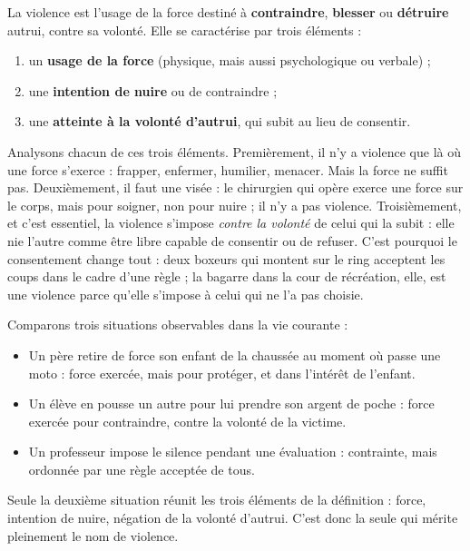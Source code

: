 \documentclass[11pt]{article}
\newcommand{\cle}[1]{{\popxbold\color{popdark}#1}}
\begin{document}
\begin{definition}[La violence]
La \cle{violence} est l'usage de la force destiné à \textbf{contraindre}, \textbf{blesser} ou \textbf{détruire} autrui, contre sa volonté. Elle se caractérise par trois éléments :
\begin{enumerate}
\item un \textbf{usage de la force} (physique, mais aussi psychologique ou verbale) ;
\item une \textbf{intention de nuire} ou de contraindre ;
\item une \textbf{atteinte à la volonté d'autrui}, qui subit au lieu de consentir.
\end{enumerate}
\end{definition}

Analysons chacun de ces trois éléments. Premièrement, il n'y a violence que là où une force s'exerce : frapper, enfermer, humilier, menacer. Mais la force ne suffit pas. Deuxièmement, il faut une visée : le chirurgien qui opère exerce une force sur le corps, mais pour soigner, non pour nuire ; il n'y a pas violence. Troisièmement, et c'est essentiel, la violence s'impose \emph{contre la volonté} de celui qui la subit : elle nie l'autre comme être libre capable de consentir ou de refuser. C'est pourquoi le consentement change tout : deux boxeurs qui montent sur le ring acceptent les coups dans le cadre d'une règle ; la bagarre dans la cour de récréation, elle, est une violence parce qu'elle s'impose à celui qui ne l'a pas choisie.

\begin{exemplebox}
Comparons trois situations observables dans la vie courante :
\begin{itemize}
\item Un père retire de force son enfant de la chaussée au moment où passe une moto : force exercée, mais pour protéger, et dans l'intérêt de l'enfant.
\item Un élève en pousse un autre pour lui prendre son argent de poche : force exercée pour contraindre, contre la volonté de la victime.
\item Un professeur impose le silence pendant une évaluation : contrainte, mais ordonnée par une règle acceptée de tous.
\end{itemize}
Seule la deuxième situation réunit les trois éléments de la définition : force, intention de nuire, négation de la volonté d'autrui. C'est donc la seule qui mérite pleinement le nom de violence.
\end{exemplebox}
\end{document}
